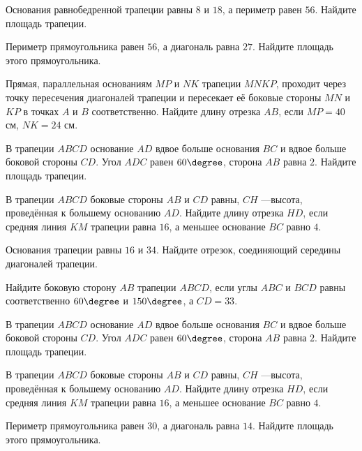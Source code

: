 \begin{class}[number=4]
	\begin{listofex}
		\item Основания равнобедренной трапеции равны \(8\) и \(18\), а периметр равен \(56\). Найдите площадь трапеции.
		\item Периметр прямоугольника равен \(56\), а диагональ равна \(27\). Найдите площадь этого прямоугольника.
		\item Прямая, параллельная основаниям \(MP\) и \(NK\) трапеции \(MNKP\), проходит через точку пересечения диагоналей трапеции и пересекает её боковые стороны \(MN\) и \(KP\) в точках  \(A\) и \(B\) соответственно. Найдите длину отрезка \(AB\), если \(MP=40\) см, \(NK=24\) см.
		\item В трапеции \(ABCD\) основание \(AD\) вдвое больше основания \(BC\) и вдвое больше боковой стороны \(CD\). Угол \(ADC\) равен \(60\degree\), сторона \(AB\) равна \(2\). Найдите площадь трапеции.
		\item В трапеции \(ABCD\) боковые стороны \(AB\) и \(CD\) равны, \(CH\) ---высота, проведённая к большему основанию \(AD\). Найдите длину отрезка \(HD\), если средняя линия \(KM\) трапеции равна \(16\), а меньшее основание \(BC\) равно \(4\).
		\item Основания трапеции равны \(16\) и \(34\). Найдите отрезок, соединяющий середины диагоналей трапеции.
		\item Найдите боковую сторону \(AB\) трапеции \(ABCD\), если углы \(ABC\) и \(BCD\) равны соответственно \(60\degree\) и \(150\degree\), а \(CD=33\).
	\end{listofex}
\end{class}

\begin{homework}[number=2]
	\begin{listofex}
		\item В трапеции \(ABCD\) основание \(AD\) вдвое больше основания \(BC\) и вдвое больше боковой стороны \(CD\). Угол \(ADC\) равен \(60\degree\), сторона \(AB\) равна \(2\). Найдите площадь трапеции.
		\item В трапеции \(ABCD\) боковые стороны \(AB\) и \(CD\) равны, \(CH\) ---высота, проведённая к большему основанию \(AD\). Найдите длину отрезка \(HD\), если средняя линия \(KM\) трапеции равна \(16\), а меньшее основание \(BC\) равно \(4\).
		\item Периметр прямоугольника равен \( 30 \), а диагональ равна \( 14 \). Найдите площадь этого прямоугольника.
	\end{listofex}
\end{homework}

